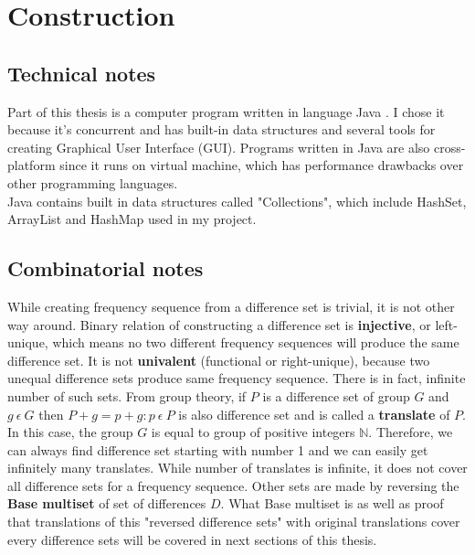 \chapter{Construction}

\section{Technical notes}
Part of this thesis is a computer program written in language Java \cite{java}. I chose it because it's concurrent and has built-in data structures and several tools for creating Graphical User Interface (GUI). Programs written in Java are also cross-platform since it runs on virtual machine, which has performance drawbacks over other programming languages.\\

Java contains built in data structures called "Collections", which include HashSet, ArrayList and HashMap used in my project.\\

\section{Combinatorial notes}

While creating frequency sequence from a difference set is trivial, it is not other way around. Binary relation of constructing a difference set is \textbf{injective}, or left-unique, which means no two different frequency sequences will produce the same difference set. It is not \textbf{univalent} (functional or right-unique), because two unequal difference sets produce same frequency sequence. There is in fact, infinite number of such sets. From group theory, if $P$ is a difference set of group $G$ and $g\ \epsilon\ G$  then $P+g = {p+g:p\  \epsilon\ P}$ is also difference set and is called a \textbf{translate} of $P$. \cite[p. 372]{course} %
\label{univalent}
 In this case, the group $G$ is equal to group of positive integers $\mathbb{N}$. Therefore, we can always find difference set starting with number 1 and we can easily get infinitely many translates. While number of translates is infinite, it does not cover all difference sets for a frequency sequence. Other sets are made by  reversing the \textbf{Base multiset}  of set of differences $D$. What Base multiset is as well as proof that translations of this "reversed difference sets" with original translations cover every difference sets will be covered in next sections of this thesis. \\
 
